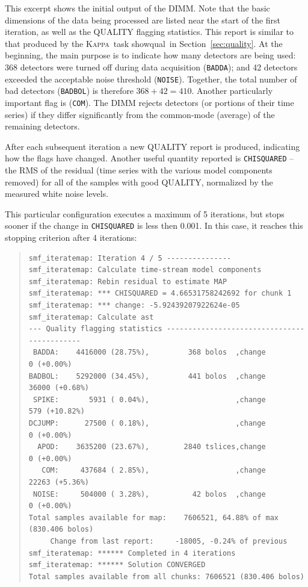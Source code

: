 \documentclass[twoside,11pt]{article}
\newcommand{\xref}[3]{#1}
\renewcommand{\_}{\texttt{\symbol{95}}}
\newenvironment{myquote}{\begin{quote}\begin{small}}{\end{small}\end{quote}}
\newcommand{\Kappa}{\xref{\textsc{Kappa}}{sun95}{}}
\newcommand{\task}[1]{\textsf{#1}}
\newcommand{\showqual}{\xref{\task{showqual}}{sun95}{SHOWQUAL}}
\begin{document}
This excerpt shows the initial output of the DIMM. Note that the basic
dimensions of the data being processed are listed near the start of
the first iteration, as well as the QUALITY flagging statistics. This
report is similar to that produced by the \Kappa\ task \showqual\ in
Section~\ref{sec:quality}. At the beginning, the main purpose is to
indicate how many detectors are being used: 368 detectors were turned
off during data acquisition (\texttt{BADDA}); and 42 detectors
exceeded the acceptable noise threshold (\texttt{NOISE}). Together,
the total number of bad detectors (\texttt{BADBOL}) is therefore
$368+42=410$. Another particularly important flag is
(\texttt{COM}). The DIMM rejects detectors (or portions of their time
series) if they differ significantly from the common-mode (average) of
the remaining detectors.

After each subsequent iteration a new QUALITY report is
produced, indicating how the flags have changed. Another useful
quantity reported is \texttt{CHISQUARED} -- the RMS of the residual
(time series with the various model components removed) for all of the
samples with good QUALITY, normalized by the measured white noise
levels.

This particular configuration executes a maximum of 5 iterations, but
stops sooner if the change in \texttt{CHISQUARED} is less then
0.001. In this case, it reaches this stopping criterion after 4
iterations:

\begin{myquote}
\begin{verbatim}
smf_iteratemap: Iteration 4 / 5 ---------------
smf_iteratemap: Calculate time-stream model components
smf_iteratemap: Rebin residual to estimate MAP
smf_iteratemap: *** CHISQUARED = 4.66531758242692 for chunk 1
smf_iteratemap: *** change: -5.92439207922624e-05
smf_iteratemap: Calculate ast
--- Quality flagging statistics --------------------------------------------
 BADDA:    4416000 (28.75%),         368 bolos  ,change          0 (+0.00%)
BADBOL:    5292000 (34.45%),         441 bolos  ,change      36000 (+0.68%)
 SPIKE:       5931 ( 0.04%),                    ,change        579 (+10.82%)
DCJUMP:      27500 ( 0.18%),                    ,change          0 (+0.00%)
  APOD:    3635200 (23.67%),        2840 tslices,change          0 (+0.00%)
   COM:     437684 ( 2.85%),                    ,change      22263 (+5.36%)
 NOISE:     504000 ( 3.28%),          42 bolos  ,change          0 (+0.00%)
Total samples available for map:    7606521, 64.88% of max (830.406 bolos)
     Change from last report:     -18005, -0.24% of previous
smf_iteratemap: ****** Completed in 4 iterations
smf_iteratemap: ****** Solution CONVERGED
Total samples available from all chunks: 7606521 (830.406 bolos)
\end{verbatim}
\end{myquote}
\end{document}
